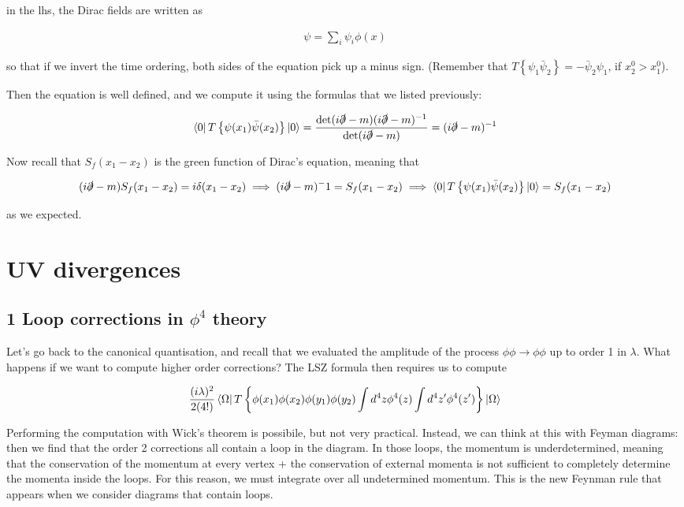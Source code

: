 \documentclass{report}
\begin{document}
in the lhs, the Dirac fields are written as 

\begin{align}
    \psi = \sum_i \psi_i \phi(x)
\end{align}

so that if we invert the time ordering, both sides of the equation pick up a minus sign. (Remember that \(T\left\{\psi_1 \bar{\psi}_2 \right\} = -\bar{\psi}_2 \psi_1\), if \(x_2^0 > x_1^0\)). 

Then the equation is well defined, and we compute it using the formulas that we listed previously: 

\begin{align}
    \bra{0}T\left\{\psi(x_1)\bar{\psi}(x_2) \right\}\ket{0} = \frac{\det (i\slashed{\partial}-m) (i\slashed{\partial}-m)^{-1}}{\det (i\slashed{\partial}-m)}  = (i\slashed{\partial}-m)^{-1}
\end{align}

Now recall that \(S_f(x_1-x_2)\) is the green function of Dirac's equation, meaning that 

\begin{align}
    (i\slashed{\partial}-m)S_f(x_1-x_2) = i\delta(x_1-x_2) \implies (i\slashed{\partial}-m)^-1 = S_f(x_1-x_2) \implies  \bra{0}T\left\{\psi(x_1)\bar{\psi}(x_2) \right\}\ket{0} = S_f(x_1-x_2)
\end{align}

as we expected. 

\chapter{UV divergences}

\section{1 Loop corrections in \(\phi^4\) theory}

Let's go back to the canonical quantisation, and recall that we evaluated the amplitude of the process \(\phi\phi \rightarrow \phi\phi\) up to order 1 in \(\lambda\). What happens if we want to compute higher order corrections? The LSZ formula then requires us to compute 

\begin{align}
    \frac{(i\lambda)^2}{2(4!)} \bra{\Omega}T\left\{\phi(x_1)\phi(x_2)\phi(y_1)\phi(y_2) \int d^4z \phi^4(z) \int d^4z' \phi^4(z')\right\}\ket{\Omega}
\end{align}

Performing the computation with Wick's theorem is possibile, but not very practical. Instead, we can think at this with Feyman diagrams: then we find that the order 2 corrections all contain a loop in the diagram. In those loops, the momentum is underdetermined, meaning that the conservation of the momentum at every vertex + the conservation of external momenta is not sufficient to completely determine the momenta inside the loops. For this reason, we must integrate over all undetermined momentum. This is the new Feynman rule that appears when we consider diagrams that contain loops. 
\end{document}
